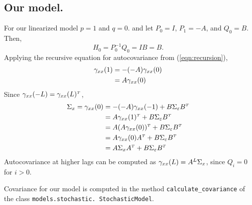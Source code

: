 \documentclass{article}
\begin{document}
\subsection{Our model.}
For our linearized model $p=1$ and $q=0$. and let $P_0=I$, $P_1=-A$, and $Q_0=B$. Then,
\begin{equation}
    H_0 = P_0^{-1} Q_0 = I B = B.
\end{equation}
Applying the recursive equation for autocovariance from (\ref{eqn:recursion}),
\begin{align}
    \gamma_{xx}(1) &= -(-A) \gamma_{xx}(0) \\
                  &= A \gamma_{xx}(0)
\end{align}
Since $\gamma_\xx(-L) = \gamma_\xx(L)\trans$,
\begin{align}
    \Sigma_x = \gamma_\xx(0)   &= -(-A)\gamma_\xx(-1) + B \Sigma_\varepsilon B\trans \\
                                &= A\gamma_\xx(1)\trans + B \Sigma_\varepsilon B\trans\\
                                &= A (A \gamma_\xx(0))\trans + B \Sigma_\varepsilon B\trans\\
                                &= A \gamma_\xx(0) A\trans + B \Sigma_\varepsilon B\trans\\
                                &= A \Sigma_x A\trans + B \Sigma_\varepsilon B\trans
\end{align}
Autocovariance at higher lags can be computed as $\gamma_{xx}(L) = A^L\Sigma_x$, since $Q_i = 0$ for $i > 0$. 

Covariance for our model is computed in the method \texttt{calculate\_covariance} of the class \texttt{models.stochastic. StochasticModel}.
\end{document}
